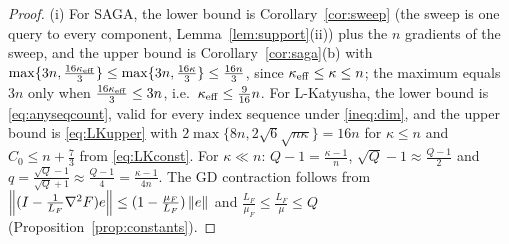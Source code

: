 \begin{proof}
(i) For SAGA, the lower bound is Corollary~\ref{cor:sweep} (the sweep is one query to every component, Lemma~\ref{lem:support}(ii)) plus the $n$ gradients of the sweep, and the upper bound is Corollary~\ref{cor:saga}(b) with $\max\{3n,\frac{16\kappa_{\rm eff}}3\}\le\max\{3n,\frac{16\kappa}3\}\le\frac{16n}3$, since $\kappa_{\rm eff}\le\kappa\le n$; the maximum equals $3n$ only when $\frac{16\kappa_{\rm eff}}3\le3n$, i.e.\ $\kappa_{\rm eff}\le\frac9{16}n$. For L-Katyusha, the lower bound is \eqref{eq:anyseqcount}, valid for every index sequence under \eqref{ineq:dim}, and the upper bound is \eqref{eq:LKupper} with $2\max\{8n,2\sqrt6\sqrt{n\kappa}\}=16n$ for $\kappa\le n$ and $C_0\le n+\frac73$ from \eqref{eq:LKconst}. For $\kappa\ll n$: $Q-1=\frac{\kappa-1}n$, $\sqrt Q-1\approx\frac{Q-1}2$ and $q=\frac{\sqrt Q-1}{\sqrt Q+1}\approx\frac{Q-1}4=\frac{\kappa-1}{4n}$. The GD contraction follows from $\left\|(I-\frac1{L_F}\nabla^2F)e\right\|\le(1-\frac{\mu_F}{L_F})\left\|e\right\|$ and $\frac{L_F}{\mu_F}\le\frac{L_F}\mu\le Q$ (Proposition~\ref{prop:constants}).


\end{proof}
